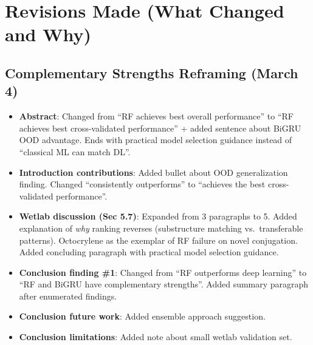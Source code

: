\documentclass[11pt,a4paper]{article}
\begin{document}
\section{Revisions Made (What Changed and Why)}

\subsection{Complementary Strengths Reframing (March 4)}
\begin{itemize}
    \item \textbf{Abstract}: Changed from ``RF achieves best overall performance'' to ``RF achieves best cross-validated performance'' + added sentence about BiGRU OOD advantage. Ends with practical model selection guidance instead of ``classical ML can match DL''.
    \item \textbf{Introduction contributions}: Added bullet about OOD generalization finding. Changed ``consistently outperforms'' to ``achieves the best cross-validated performance''.
    \item \textbf{Wetlab discussion (Sec 5.7)}: Expanded from 3 paragraphs to 5. Added explanation of \textit{why} ranking reverses (substructure matching vs.\ transferable patterns). Octocrylene as the exemplar of RF failure on novel conjugation. Added concluding paragraph with practical model selection guidance.
    \item \textbf{Conclusion finding \#1}: Changed from ``RF outperforms deep learning'' to ``RF and BiGRU have complementary strengths''. Added summary paragraph after enumerated findings.
    \item \textbf{Conclusion future work}: Added ensemble approach suggestion.
    \item \textbf{Conclusion limitations}: Added note about small wetlab validation set.
\end{itemize}
\end{document}
